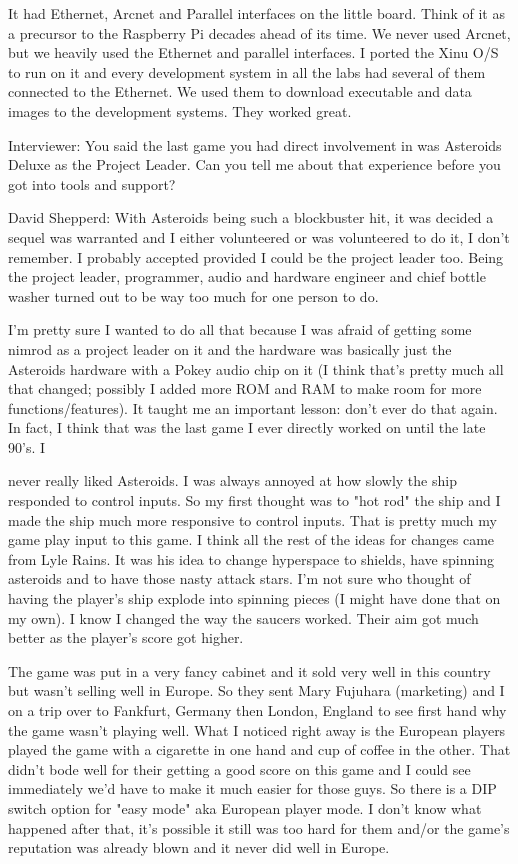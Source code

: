 It had Ethernet, Arcnet and Parallel interfaces on the little board. Think of it as a precursor to the Raspberry Pi decades ahead of its time. We never used Arcnet, but we heavily used the Ethernet and parallel interfaces. I ported the Xinu O/S to run on it and every development system in all the labs had several of them connected to the Ethernet. We used them to download executable and data images to the development systems. They worked great. 

\textcolor{interviewer}{Interviewer:} You said the last game you had direct involvement in was Asteroids Deluxe as the Project Leader. Can you tell me about that experience before you got into tools and support?

\textcolor{interviewee}{David Shepperd:} With Asteroids being such a blockbuster hit, it was decided a sequel was warranted and I either volunteered or was volunteered to do it, I don't remember. I probably accepted provided I could be the project leader too. Being the project leader, programmer, audio and hardware engineer and chief bottle washer turned out to be way too much for one person to do. 

I'm pretty sure I wanted to do all that because I was afraid of getting some nimrod as a project leader on it and the hardware was basically just the Asteroids hardware with a Pokey audio chip on it (I think that's pretty much all that changed; possibly I added more ROM and RAM to make room for more functions/features). It taught me an important lesson: don't ever do that again. In fact, I think that was the last game I ever directly worked on until the late 90's. I

 never really liked Asteroids. I was always annoyed at how slowly the ship responded to control inputs. So my first thought was to "hot rod" the ship and I made the ship much more responsive to control inputs. That is pretty much my game play input to this game. I think all the rest of the ideas for changes came from Lyle Rains. It was his idea to change hyperspace to shields, have spinning asteroids and to have those nasty attack stars. I'm not sure who thought of having the player's ship explode into spinning pieces (I might have done that on my own). I know I changed the way the saucers worked. Their aim got much better as the player's score got higher. 

The game was put in a very fancy cabinet and it sold very well in this country but wasn't selling well in Europe. So they sent Mary Fujuhara (marketing) and I on a trip over to Fankfurt, Germany then London, England to see first hand why the game wasn't playing well. What I noticed right away is the European players played the game with a cigarette in one hand and cup of coffee in the other. That didn't bode well for their getting a good score on this game and I could see immediately we'd have to make it much easier for those guys. So there is a DIP switch option for "easy mode" aka European player mode. I don't know what happened after that, it's possible it still was too hard for them and/or the game's reputation was already blown and it never did well in Europe. 

